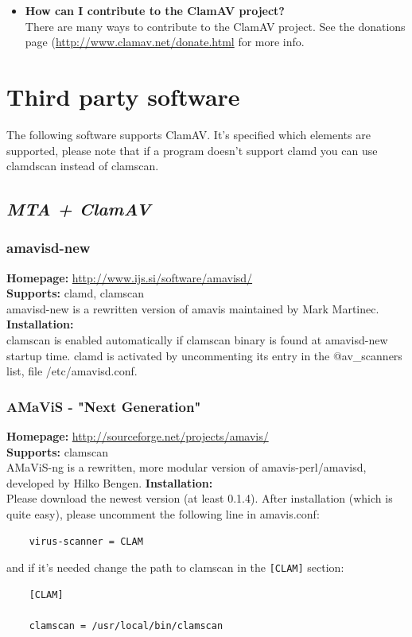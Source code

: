 \documentclass[a4paper,titlepage,12pt]{article}
\begin{document}
\begin{itemize}
	\item \textbf{How can I contribute to the ClamAV project?}\\
	There are many ways to contribute to the ClamAV project. See the
	donations page (\url{http://www.clamav.net/donate.html} for more info.
    \end{itemize}

    \section{Third party software}
    The following software supports ClamAV. It's specified which elements are
    supported, please note that if a program doesn't support clamd you can
    use clamdscan instead of clamscan.

    \subsection{\emph{MTA + ClamAV}}

    \subsubsection{amavisd-new}
    \textbf{Homepage:} \url{http://www.ijs.si/software/amavisd/}\\
    \textbf{Supports:} clamd, clamscan\\[4pt]
    amavisd-new is a rewritten version of amavis maintained by
    Mark Martinec.\\[4pt]
    \textbf{Installation:}\\
    clamscan is enabled automatically if clamscan binary is found
    at amavisd-new startup time. clamd is activated by uncommenting
    its entry in the @av\_scanners list, file /etc/amavisd.conf.

    \subsubsection{AMaViS - "Next Generation"}
    \textbf{Homepage:} \url{http://sourceforge.net/projects/amavis/}\\
    \textbf{Supports:} clamscan\\[4pt]
    AMaViS-ng is a rewritten, more modular version of amavis-perl/amavisd,
    developed by Hilko Bengen.
    \textbf{Installation:}\\

    \noindent Please download the newest version (at least 0.1.4).
    After installation (which is quite easy), please uncomment the following
    line in amavis.conf:
    \begin{verbatim}
	virus-scanner = CLAM
    \end{verbatim}
    and if it's needed change the path to clamscan in the \verb+[CLAM]+ section:
    \begin{verbatim}
	[CLAM]

	clamscan = /usr/local/bin/clamscan
    \end{verbatim}
\end{document}
